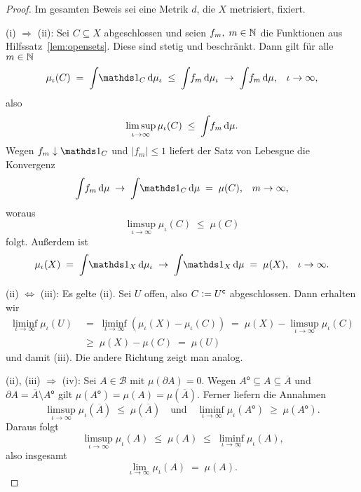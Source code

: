 \documentclass[../main/main.tex]{subfiles}
\begin{document}
	
	\begin{proof}
		Im gesamten Beweis sei eine Metrik $d$, die $X$ metrisiert, fixiert.
		
		(i) $\Rightarrow$ (ii): Sei $C \subseteq X$ abgeschlossen und seien 
		$f_m, \; m \in \mathbb{N}$ die Funktionen aus Hilfssatz~\ref{lem:opensets}. 
		Diese sind stetig und beschränkt.
		Dann gilt für alle $m \in \mathbb{N}$
		$$\mu_\iota(C) \; = \; \measureint{}{\indfct_C}{\mu_\iota} \; \leq \; 
		\measureint{}{f_m}{\mu_\iota} \; \to \;
		\measureint{}{f_m}{\mu} \text{,} \quad \iota \to \infty \text{,}$$
		also 
		$$\limsup_{\iota \to \infty} \mu_\iota(C) \; \leq \; 
		\int_{} \, f_m \, \mathrm{d}\mu \text{.}$$
		Wegen $f_m \convdown \indfct_C$ und $| f_m | \leq 1$ 
		liefert der Satz von Lebesgue die Konvergenz
		$$\measureint{}{f_m}{\mu} \; \to \;
		\measureint{}{\indfct_C}{\mu} \; = \; \mu(C) \text{,} 
		\quad m \to \infty \text{,}$$
		woraus
		$$\limsup_{\iota \to \infty} \mu_\iota(C) \; \leq \; \mu(C)$$
		folgt. Außerdem ist 
		$$\mu_\iota(X) \; = \; \measureint{}{\indfct_{X}}{\mu_\iota} \; \to \; \measureint{}{\indfct_{X}}{\mu} \; = \; \mu(X) \text{,} 
		\quad \iota \to \infty \text{.}$$
		
		(ii) $\Leftrightarrow$ (iii): Es gelte (ii). Sei $U$ offen, also 
		$C \vcentcolon = U^\mathsf{c}$ abgeschlossen. Dann erhalten wir
		\begin{align*}
			\liminf_{\iota \to \infty} \mu_\iota(U) \; &= \; \liminf_{\iota \to \infty} (\mu_\iota(X) - \mu_\iota(C)) \; = \;
			\mu(X) - \limsup_{\iota \to \infty} \mu_\iota(C) \\
			&\geq \; 
			\mu(X) - \mu(C) \; = \; \mu(U)
		\end{align*}
		und damit (iii). Die andere Richtung zeigt man analog.
		
		(ii), (iii) $\Rightarrow$ (iv): Sei $A \in \mathcal{B}$ mit 
		$\mu(\partial A) = 0$. Wegen
		$A^\mathsf{o} \subseteq A \subseteq \overline{A}$ und 
		$\partial A = \overline{A} \setminus A^\mathsf{o}$ gilt $\mu(A^\mathsf{o}) = 
		\mu(A) = \mu(\overline{A}) \text{.}$
		Ferner liefern die Annahmen
		$$\limsup_{\iota \to \infty} \mu_\iota(\overline{A}) \; \leq \; 
		\mu(\overline{A}) \quad \text{und} \quad 
		\liminf_{\iota \to \infty} \mu_\iota(A^\mathsf{o}) \; \geq \; 
		\mu(A^\mathsf{o}) \text{.}$$
		Daraus folgt
		$$\limsup_{\iota \to \infty} \mu_\iota(A) \; \leq \; 
		\mu(A) \; \leq \; \liminf_{\iota \to \infty} \mu_\iota(A) \text{,}$$
		also insgesamt
		$$\lim_{\iota \to \infty} \mu_\iota(A) \; = \; \mu(A) \text{.}$$
		

\end{proof}
\end{document}
